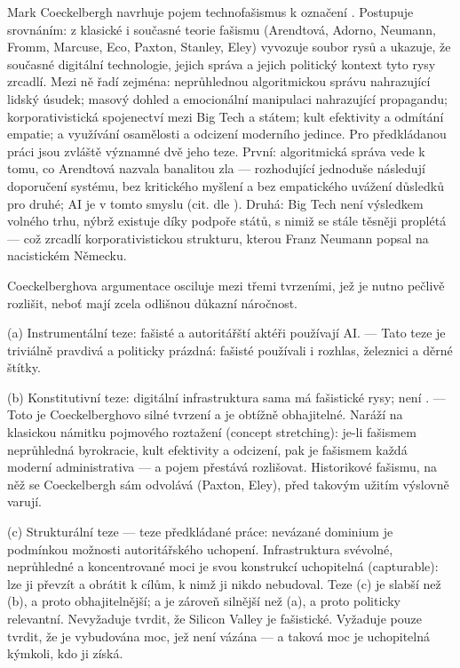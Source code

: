 Mark Coeckelbergh navrhuje pojem technofašismus k označení  \parencite{Coeckelbergh26}.
Postupuje srovnáním: z klasické i současné teorie fašismu (Arendtová, Adorno, Neumann, Fromm, Marcuse, Eco, Paxton, Stanley, Eley) vyvozuje soubor rysů a ukazuje, že současné digitální technologie, jejich správa a jejich politický kontext tyto rysy zrcadlí.
Mezi ně řadí zejména: neprůhlednou algoritmickou správu nahrazující lidský úsudek;
masový dohled a emocionální manipulaci nahrazující propagandu; korporativistická spojenectví mezi Big Tech a státem; kult efektivity a odmítání empatie; a využívání osamělosti a odcizení moderního jedince.
Pro předkládanou práci jsou zvláště významné dvě jeho teze. První: algoritmická správa vede k tomu, co Arendtová nazvala banalitou zla — rozhodující jednoduše následují doporučení systému, bez kritického myšlení a bez empatického uvážení důsledků pro druhé;
AI je v tomto smyslu  \parencite{McQuillan22} (cit. dle \parencite{Coeckelbergh26}). Druhá: Big Tech není výsledkem volného trhu, nýbrž existuje díky podpoře států, s nimiž se stále těsněji proplétá — což zrcadlí korporativistickou strukturu, kterou Franz Neumann popsal na nacistickém Německu.


Coeckelberghova argumentace osciluje mezi třemi tvrzeními, jež je nutno pečlivě rozlišit, neboť mají zcela odlišnou důkazní náročnost.


(a) Instrumentální teze: fašisté a autoritářští aktéři používají AI. — Tato teze je triviálně pravdivá a politicky prázdná: fašisté používali i rozhlas, železnici a děrné štítky.


(b) Konstitutivní teze: digitální infrastruktura sama má fašistické rysy; není . — Toto je Coeckelberghovo silné tvrzení a je obtížně obhajitelné.
Naráží na klasickou námitku pojmového roztažení (concept stretching): je-li fašismem neprůhledná byrokracie, kult efektivity a odcizení, pak je fašismem každá moderní administrativa — a pojem přestává rozlišovat. Historikové fašismu, na něž se Coeckelbergh sám odvolává (Paxton, Eley), před takovým užitím výslovně varují.


(c) Strukturální teze — teze předkládané práce: nevázané dominium je podmínkou možnosti autoritářského uchopení.
Infrastruktura svévolné, neprůhledné a koncentrované moci je svou konstrukcí uchopitelná (capturable): lze ji převzít a obrátit k cílům, k nimž ji nikdo nebudoval.
Teze (c) je slabší než (b), a proto obhajitelnější; a je zároveň silnější než (a), a proto politicky relevantní.
Nevyžaduje tvrdit, že Silicon Valley je fašistické. Vyžaduje pouze tvrdit, že je vybudována moc, jež není vázána — a taková moc je uchopitelná kýmkoli, kdo ji získá.

